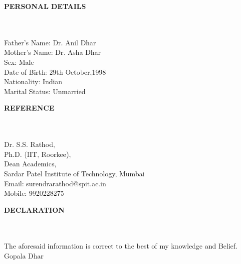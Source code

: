 \documentclass[a4paper,10pt]{article}
\newcommand{\lsep}{-0.5cm}
\newcommand{\resheading}[1]{{\small \colorbox{mygrey}{\begin{minipage}{0.975\textwidth}{\textbf{#1 \vphantom{p\^{E}}}}\end{minipage}}}}
\begin{document}
\resheading{\textbf{PERSONAL DETAILS} }\\\\[\lsep]

\indent Father's Name:   Dr. Anil Dhar\\ 
\indent Mother's Name:   Dr. Asha Dhar\\
\indent Sex:   Male\\
\indent Date of Birth:   29th October,1998\\
\indent Nationality:   Indian\\
\indent Marital Status:   Unmarried\\

\resheading{\textbf{REFERENCE} }\\\\[\lsep]

\indent Dr. S.S. Rathod, \\
\indent Ph.D. (IIT, Roorkee), \\
\indent Dean Academics, \\
\indent Sardar Patel Institute of Technology, Mumbai\\
\indent Email: surendra\textunderscore rathod@spit.ac.in\\
\indent Mobile: 9920228275\\

\resheading{\textbf{DECLARATION} }\\\\[\lsep]

\indent The aforesaid information is correct to the best of my knowledge and Belief.
\flushright Gopala Dhar\\
\end{document}
